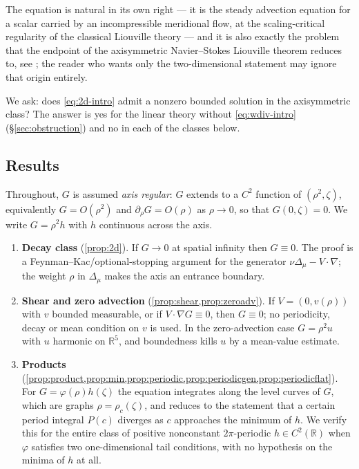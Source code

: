 \documentclass[11pt]{article}
\theoremstyle{definition}
\newcommand{\R}{\mathbb{R}}
\begin{document}
The equation is natural in its own right --- it is the steady advection
equation for a scalar carried by an incompressible meridional flow, at the
scaling-critical regularity of the classical Liouville theory --- and it is
also exactly the problem that the endpoint of the axisymmetric
Navier--Stokes Liouville theorem reduces to, see
\cite{companion}; the reader who wants only the two-dimensional statement may
ignore that origin entirely.

We ask: does \eqref{eq:2d-intro} admit a nonzero bounded solution in the
axisymmetric class? The answer is yes for the linear theory without
\eqref{eq:wdiv-intro} (\S\ref{sec:obstruction}) and no in each of the classes
below.

\subsection{Results}
Throughout, $G$ is assumed \emph{axis regular}: $G$ extends to a $C^2$
function of $(\rho^2,\zeta)$, equivalently $G=O(\rho^2)$ and
$\partial_\rho G=O(\rho)$ as $\rho\to0$, so that $G(0,\zeta)=0$. We write
$G=\rho^2h$ with $h$ continuous across the axis.

\begin{enumerate}
\item \textbf{Decay class} (\cref{prop:2d}). If $G\to0$ at spatial infinity
then $G\equiv0$. The proof is a Feynman--Kac/optional-stopping argument for
the generator $\nu\Delta_\mu-V\cdot\nabla$; the weight $\rho$ in $\Delta_\mu$
makes the axis an entrance boundary.
\item \textbf{Shear and zero advection} (\cref{prop:shear,prop:zeroadv}). If
$V=(0,v(\rho))$ with $v$ bounded measurable, or if $V\cdot\nabla G\equiv0$,
then $G\equiv0$; no periodicity, decay or mean condition on $v$ is used. In
the zero-advection case $G=\rho^2u$ with $u$ harmonic on $\R^5$, and
boundedness kills $u$ by a mean-value estimate.
\item \textbf{Products} (\cref{prop:product,prop:min,prop:periodic,prop:periodicgen,prop:periodicflat}).
For $G=\varphi(\rho)h(\zeta)$ the equation integrates along the level curves
of $G$, which are graphs $\rho=\rho_c(\zeta)$, and reduces to the statement
that a certain period integral $P(c)$ diverges as $c$ approaches the minimum
of $h$. We verify this for the entire class of positive nonconstant
$2\pi$-periodic $h\in C^2(\R)$ when $\varphi$ satisfies two one-dimensional
tail conditions, with no hypothesis on the minima of $h$ at all.
\end{enumerate}
\end{document}

